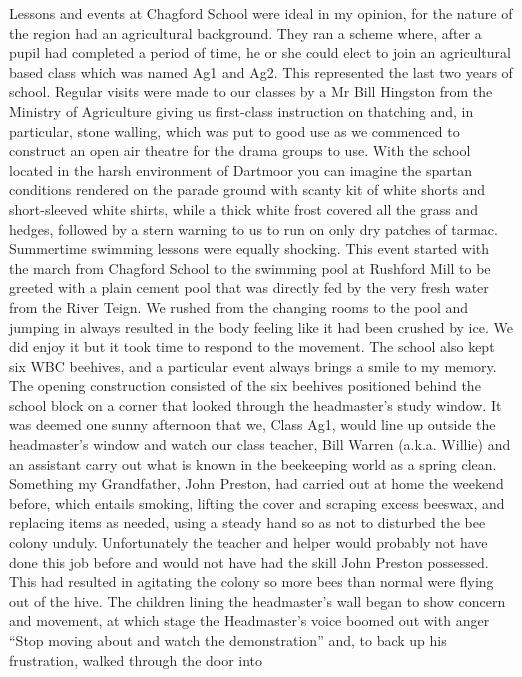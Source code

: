 Lessons and events at Chagford School were ideal in my opinion, for the nature
of the region had an agricultural background. They ran a scheme where, after a
pupil had completed a period of time, he or she could elect to join an
agricultural based class which was named Ag1 and Ag2. This represented the last
two years of school. Regular visits were made to our classes by a Mr Bill
Hingston from the Ministry of Agriculture giving us first-class instruction on
thatching and, in particular, stone walling, which was put to good use as we
commenced to construct an open air theatre for the drama groups to use. With
the school located in the harsh environment of Dartmoor you can imagine the
spartan conditions rendered on the parade ground with scanty kit of white
shorts and short-sleeved white shirts, while a thick white frost covered all
the grass and hedges, followed by a stern warning to us to run on only dry
patches of tarmac. Summertime swimming lessons were equally shocking. This
event started with the march from Chagford School to the swimming pool at
Rushford Mill to be greeted with a plain cement pool that was directly fed by
the very fresh water from the River Teign. We rushed from the changing rooms to
the pool and jumping in always resulted in the body feeling like it had been
crushed by ice. We did enjoy it but it took time to respond to the movement.
The school also kept six WBC beehives, and a particular event always brings a
smile to my memory. The opening construction consisted of the six beehives
positioned behind the school block on a corner that looked through the
headmaster's study window. It was deemed one sunny afternoon that we, Class
Ag1, would line up outside the headmaster's window and watch our class teacher,
Bill Warren (a.k.a. Willie) and an assistant carry out what is known in the
beekeeping world as a spring clean. Something my Grandfather, John Preston, had
carried out at home the weekend before, which entails smoking, lifting the
cover and scraping excess beeswax, and replacing items as needed, using a
steady hand so as not to disturbed the bee colony unduly. Unfortunately the
teacher and helper would probably not have done this job before and would not
have had the skill John Preston possessed. This had resulted in agitating the
colony so more bees than normal were flying out of the hive. The children
lining the headmaster's wall began to show concern and movement, at which stage
the Headmaster's voice boomed out with anger ``Stop moving about and watch the
demonstration'' and, to back up his frustration, walked through the door into
